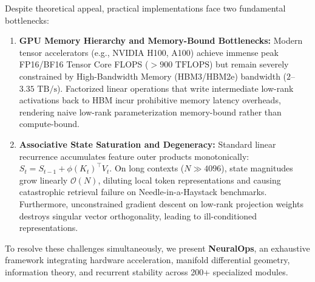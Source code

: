\documentclass[10pt,twocolumn,letterpaper]{article}
\begin{document}
Despite theoretical appeal, practical implementations face two fundamental bottlenecks:
\begin{enumerate}
    \item \textbf{GPU Memory Hierarchy and Memory-Bound Bottlenecks:} Modern tensor accelerators (e.g., NVIDIA H100, A100) achieve immense peak FP16/BF16 Tensor Core FLOPS ($>900\text{ TFLOPS}$) but remain severely constrained by High-Bandwidth Memory (HBM3/HBM2e) bandwidth ($2$--$3.35\text{ TB/s}$). Factorized linear operations that write intermediate low-rank activations back to HBM incur prohibitive memory latency overheads, rendering naive low-rank parameterization memory-bound rather than compute-bound.
    \item \textbf{Associative State Saturation and Degeneracy:} Standard linear recurrence accumulates feature outer products monotonically: $S_t = S_{t-1} + \phi(K_t)^\top V_t$. On long contexts ($N \gg 4096$), state magnitudes grow linearly $\mathcal{O}(N)$, diluting local token representations and causing catastrophic retrieval failure on Needle-in-a-Haystack benchmarks. Furthermore, unconstrained gradient descent on low-rank projection weights destroys singular vector orthogonality, leading to ill-conditioned representations.
\end{enumerate}

To resolve these challenges simultaneously, we present \textbf{NeuralOps}, an exhaustive framework integrating hardware acceleration, manifold differential geometry, information theory, and recurrent stability across 200+ specialized modules.
\end{document}
